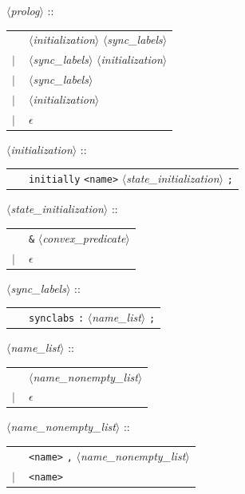 \documentclass[a4paper,11pt]{report}
\newcommand{\emptystring}{$\epsilon$}
\newcommand{\nt}[1]{$\langle$\emph{#1}$\rangle$}
\newcommand{\regleGrammaire}[1]{\bigskip \noindent \nt{#1} :: \\}
\newcommand{\npec}[1]{\textcolor{green!50!black}{#1}}
\newcommand{\styleIMI}[1]{\textcolor{imicolor}{\texttt{#1}}}
\begin{document}
\regleGrammaire{prolog}
\begin{tabular}{l l}
	\  & \npec{\nt{initialization}} \nt{sync\_labels} \\
	$|$ & \nt{sync\_labels} \npec{\nt{initialization}} \\
	$|$ & \nt{sync\_labels} \\
	$|$ & \npec{\nt{initialization}} \\
	$|$ & \emptystring \\
\end{tabular}

\regleGrammaire{\npec{initialization}}
\npec{
\begin{tabular}{l l}
	\  & \styleIMI{initially} \styleIMI{<name>} \nt{state\_initialization} \styleIMI{;} \\
\end{tabular}
}

\regleGrammaire{\npec{state\_initialization}}
\npec{
\begin{tabular}{l l}
	\  & \styleIMI{\&} \nt{convex\_predicate} \\
	$|$ & \emptystring \\
\end{tabular}
}

\regleGrammaire{sync\_labels}
\begin{tabular}{l l}
	\  & \styleIMI{synclabs} \styleIMI{:} \nt{name\_list} \styleIMI{;} \\
\end{tabular}

\regleGrammaire{name\_list}
\begin{tabular}{l l}
	\  & \nt{name\_nonempty\_list} \\
	$|$ & \emptystring \\
\end{tabular}

\regleGrammaire{name\_nonempty\_list}
\begin{tabular}{l l}
	\  & \styleIMI{<name>} \styleIMI{,} \nt{name\_nonempty\_list} \\
	$|$ & \styleIMI{<name>} \\
\end{tabular}
\end{document}
